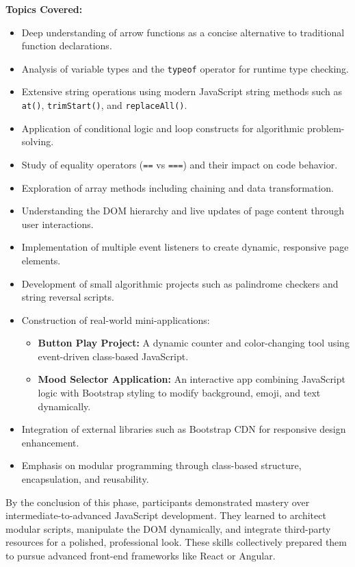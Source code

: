 \documentclass[a4paper,12pt,oneside]{report}
\numberwithin{equation}{chapter}
\numberwithin{figure}{chapter}
\numberwithin{table}{chapter}
\begin{document}
\textbf{Topics Covered:}
\begin{itemize}
    \item Deep understanding of arrow functions as a concise alternative to traditional function declarations.
    \item Analysis of variable types and the \texttt{typeof} operator for runtime type checking.
    \item Extensive string operations using modern JavaScript string methods such as \texttt{at()}, \texttt{trimStart()}, and \texttt{replaceAll()}.
    \item Application of conditional logic and loop constructs for algorithmic problem-solving.
    \item Study of equality operators (\texttt{==} vs \texttt{===}) and their impact on code behavior.
    \item Exploration of array methods including chaining and data transformation.
    \item Understanding the DOM hierarchy and live updates of page content through user interactions.
    \item Implementation of multiple event listeners to create dynamic, responsive page elements.
    \item Development of small algorithmic projects such as palindrome checkers and string reversal scripts.
    \item Construction of real-world mini-applications:
    \begin{itemize}
        \item \textbf{Button Play Project:} A dynamic counter and color-changing tool using event-driven class-based JavaScript.
        \item \textbf{Mood Selector Application:} An interactive app combining JavaScript logic with Bootstrap styling to modify background, emoji, and text dynamically.
    \end{itemize}
    \item Integration of external libraries such as Bootstrap CDN for responsive design enhancement.
    \item Emphasis on modular programming through class-based structure, encapsulation, and reusability.
\end{itemize}

By the conclusion of this phase, participants demonstrated mastery over intermediate-to-advanced JavaScript development. They learned to architect modular scripts, manipulate the DOM dynamically, and integrate third-party resources for a polished, professional look. These skills collectively prepared them to pursue advanced front-end frameworks like React or Angular.
\end{document}
